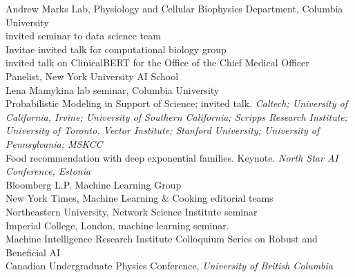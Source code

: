 \documentclass[4pt, letterpaper]{article}
\begin{document}
Andrew Marks Lab, Physiology and Cellular Biophysics Department, Columbia University\\
 invited seminar to data science team \\
Invitae invited talk for computational biology group\\
 invited talk on ClinicalBERT for the Office of the Chief Medical Officer\\
Panelist, {New York University AI School}\\
Lena Mamykina lab seminar, Columbia University \\
Probabilistic Modeling in Support of Science; invited talk. \emph{Caltech; University of California, Irvine; University of Southern California; Scripps Research Institute; University of Toronto, Vector Institute; Stanford University; University of Pennsylvania; MSKCC}\\
Food recommendation with deep exponential families. Keynote. \emph{
{North
Star AI Conference}, Estonia} \\
Bloomberg L.P. Machine Learning Group \\
New York Times, Machine Learning \& Cooking editorial teams\\
Northeastern University, Network Science Institute seminar\\
Imperial College, London, machine learning seminar. \\
Machine Intelligence Research Institute {Colloquium Series on Robust and Beneficial AI}\\
Canadian Undergraduate Physics Conference, \emph{University of British Columbia}
\end{document}
